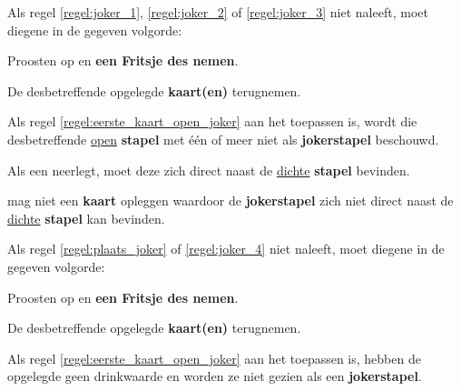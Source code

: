 \vervolgLijst{}
\item Als \eenSpeler regel \ref{regel:joker_1}, \ref{regel:joker_2} of \ref{regel:joker_3} niet naleeft, moet diegene in de gegeven volgorde:
\puntLijst{}
\item Proosten op  en \textbf{een Fritsje des nemen}\footnotemark[3].
\item De desbetreffende opgelegde \textbf{kaart(en)} terugnemen.
\eindPuntLijst{}
\label{regel:kaarten_terugnemen_3}
\eindLijst{}

\vervolgLijst{}
\item Als \Frits regel \ref{regel:eerste_kaart_open_joker} aan het toepassen is, wordt die desbetreffende \ul{open} \textbf{stapel} met \'e\'en of meer  niet als \textbf{jokerstapel} beschouwd.
\eindLijst{}


\vervolgLijst{}
\item Als \eenSpeler een \footnotemark[1] neerlegt, moet deze zich direct naast de \ul{dichte} \textbf{stapel} bevinden.
\label{regel:plaats_joker}
\eindLijst{}

\vervolgLijst{}
\item \EenSpeler mag niet een \textbf{kaart} opleggen waardoor de \textbf{jokerstapel} zich niet direct naast de \ul{dichte} \textbf{stapel} kan bevinden.
\label{regel:joker_4}
\eindLijst{}

\vervolgLijst{}
\item Als \eenSpeler regel \ref{regel:plaats_joker} of \ref{regel:joker_4} niet naleeft, moet diegene in de gegeven volgorde:
\puntLijst{}
\item Proosten op  en \textbf{een Fritsje des nemen}\footnotemark[3].
\item De desbetreffende opgelegde \textbf{kaart(en)} terugnemen.
\eindPuntLijst{}
\label{regel:kaarten_terugnemen_4}
\eindLijst{}


\vervolgLijst{}
\item Als \Frits regel \ref{regel:eerste_kaart_open_joker} aan het toepassen is, hebben de opgelegde \footnotemark[1] geen drinkwaarde en worden ze niet gezien als een \textbf{jokerstapel}.
\eindLijst{}

